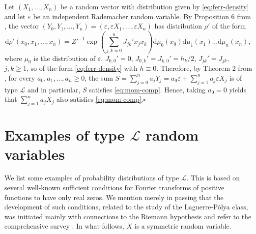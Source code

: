 \documentclass[10pt]{article}
\newcommand{\dd}{\mathrm{d}}
\newcommand{\1}{\textbf{1}}
\newcommand{\e}{\varepsilon}
\newcommand{\sL}{\mathscr{L}}
\theoremstyle{remark}
\theoremstyle{definition}
\begin{document}
Let $(X_1, \ldots, X_n)$ be a random vector with distribution given by \eqref{eq:ferr-density} and let $\e$ be an independent Rademacher random variable. By Proposition 6 from \cite{N3}, the vector $(Y_0,Y_1,\dots,Y_n) = (\e,\e X_1,\dots,\e X_n)$ has distribution $\rho'$ of the form
\[
\dd\rho'(x_0,x_1,\ldots,x_n) = Z'^{-1}\exp\left(\sum_{j,k=0}^n J_{jk}'x_jx_k\right)\dd\mu_0(x_0)\dd\mu_1(x_1)\dots\dd\mu_n(x_n),
\]
where $\mu_0$ is the distribution of $\e$, $J_{0,0}' = 0$, $J_{0,k}' = J_{k,0}'= h_k/2$, $J_{jk}' = J_{jk}$, $j,k \geq 1$, so of the form \eqref{eq:ferr-density} with $h \equiv 0$. Therefore, by Theorem 2 from \cite{N2}, for every $a_0, a_1,\dots, a_n \geq 0$, the sum $S = \sum_{j=0}^n a_jY_j = a_0\e + \sum_{j=1}^n a_j\e X_j$ is of type $\sL$ and in particular, $S$ satisfies \eqref{eq:mom-comp}. Hence, taking $a_0 = 0$ yields that $\sum_{j=1}^n a_jX_j$ also satisfies \eqref{eq:mom-comp}.\hfill$\square$



\section{Examples of type $\mathscr{L}$ random variables}\label{sec:examples}


We list some examples of probability distributions of type $\sL$. This is based on several well-known sufficient conditions for Fourier transforms of positive functions to have only real zeros. We mention merely in passing that the development of such conditions, related to the study of the Laguerre-P\'olya class, was initiated mainly with connections to the Riemann hypothesis and refer to the comprehensive survey \cite{sur}. In what follows, $X$ is a symmetric random variable.
\end{document}
